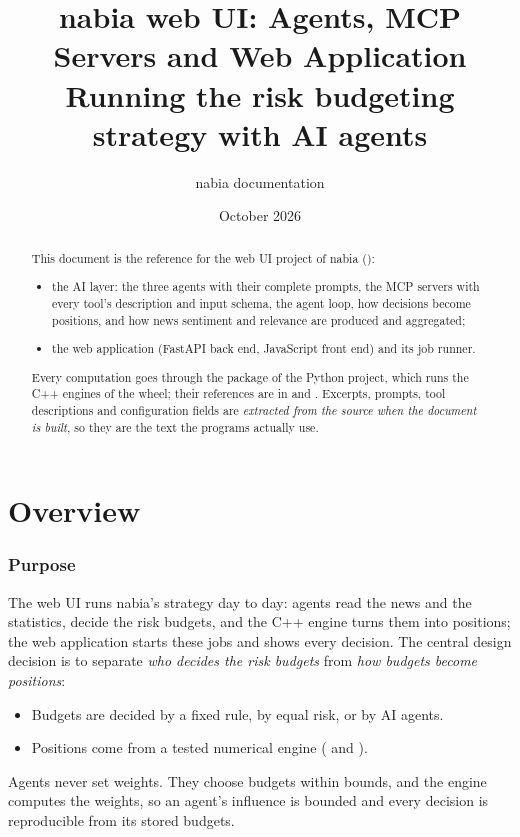 \documentclass[11pt,a4paper]{article}
\title{nabia web UI: Agents, MCP Servers and Web Application\\[0.3em]
\large Running the risk budgeting strategy with AI agents}
\author{nabia documentation}
\date{October 2026}
\begin{document}
\maketitle

\begin{abstract}
This document is the reference for the web UI project of nabia ():
\begin{itemize}
  \item the AI layer: the three agents with their complete prompts, the MCP servers with
        every tool's description and input schema, the agent loop, how decisions become
        positions, and how news sentiment and relevance are produced and aggregated;
  \item the web application (FastAPI back end, JavaScript front end) and its job runner.
\end{itemize}
Every computation goes through the  package of the Python project, which runs the
C++ engines of the  wheel; their references are in
 and . Excerpts, prompts, tool descriptions and configuration
fields are \emph{extracted from the source when the document is built}, so they are the text
the programs actually use.
\end{abstract}

\tableofcontents
\clearpage
\part{Overview}

\section{Purpose}
The web UI runs nabia's strategy day to day: agents read the news and the statistics, decide
the risk budgets, and the C++ engine turns them into positions; the web application starts
these jobs and shows every decision. The central design decision is to separate \emph{who
decides the risk budgets} from \emph{how budgets become positions}:
\begin{itemize}
  \item Budgets are decided by a fixed rule, by equal risk, or by AI agents.
  \item Positions come from a tested numerical engine ( and
        ).
\end{itemize}
Agents never set weights. They choose budgets within bounds, and the engine computes the
weights, so an agent's influence is bounded and every decision is reproducible from its
stored budgets.
\end{document}

